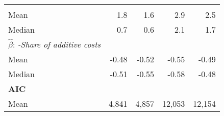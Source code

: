 \begin{tabular}{lllll}
  \multicolumn{1}{|r}{} &
  \multicolumn{1}{r}{} &
  \multicolumn{1}{r}{} &
  \multicolumn{1}{r}{} \\
\multicolumn{1}{l}{\hspace{2em}Mean} &
  \multicolumn{1}{|r}{1.8} &
  \multicolumn{1}{r}{1.6} &
  \multicolumn{1}{r}{2.9} &
  \multicolumn{1}{r}{2.5} \\
\multicolumn{1}{l}{\hspace{2em}Median} &
  \multicolumn{1}{|r}{0.7} &
  \multicolumn{1}{r}{0.6} &
  \multicolumn{1}{r}{2.1} &
  \multicolumn{1}{r}{1.7} \\
\multicolumn{1}{l}{\hspace{1em}$\widehat{\beta}$:  \textit{-Share of additive costs}} &
  \multicolumn{1}{|r}{} &
  \multicolumn{1}{r}{} &
  \multicolumn{1}{r}{} &
  \multicolumn{1}{r}{} \\
\multicolumn{1}{l}{\hspace{2em}Mean} &
  \multicolumn{1}{|r}{-0.48} &
  \multicolumn{1}{r}{-0.52} &
  \multicolumn{1}{r}{-0.55} &
  \multicolumn{1}{r}{-0.49} \\
\multicolumn{1}{l}{\hspace{2em}Median} &
  \multicolumn{1}{|r}{-0.51} &
  \multicolumn{1}{r}{-0.55} &
  \multicolumn{1}{r}{-0.58} &
  \multicolumn{1}{r}{-0.48} \\
\multicolumn{1}{l}{{\textbf{AIC}}} &
  \multicolumn{1}{|r}{} &
  \multicolumn{1}{r}{} &
  \multicolumn{1}{r}{} &
  \multicolumn{1}{r}{} \\
\multicolumn{1}{l}{\hspace{1em}Mean} &
  \multicolumn{1}{|r}{4,841} &
  \multicolumn{1}{r}{4,857} &
  \multicolumn{1}{r}{12,053} &
  \multicolumn{1}{r}{12,154} \\
\cline{1-5}
\end{tabular}

